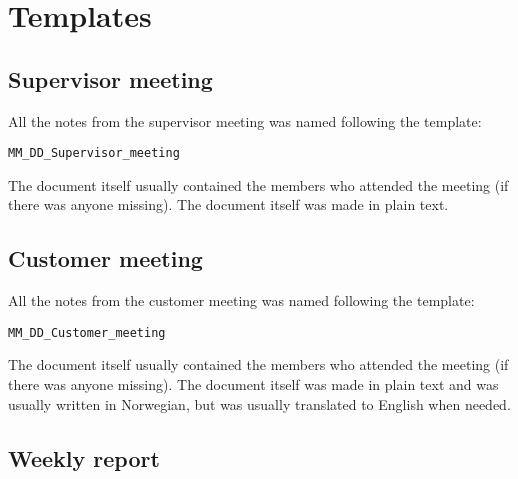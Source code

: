 \chapter{Templates}\label{appendixTemplate}
\section{Supervisor meeting}\label{namingTemplate}
All the notes from the supervisor meeting was named following the template: 
\begin{verbatim}
MM_DD_Supervisor_meeting
\end{verbatim}
The document itself usually contained the members who attended the meeting (if there was anyone missing).
The document itself was made in plain text.
\newpage
\section{Customer meeting}
All the notes from the customer meeting was named following the template: 
\begin{verbatim}
MM_DD_Customer_meeting
\end{verbatim}
The document itself usually contained the members who attended the meeting (if there was anyone missing).
The document itself was made in plain text and was usually written in Norwegian, but was usually translated to English when needed.
\newpage
\section{Weekly report}\label{weeklyReport}

